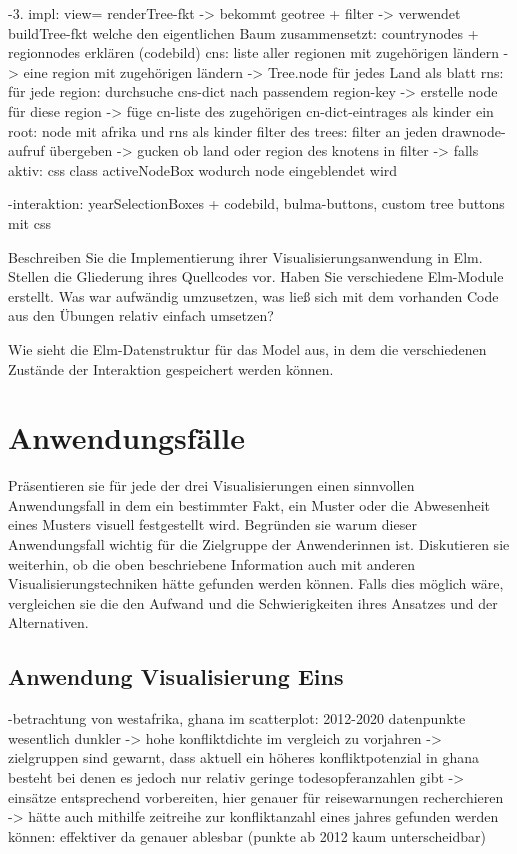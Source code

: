 \documentclass[usegeometry=true]{scrartcl}
\begin{document}
-3. impl: view= renderTree-fkt -> bekommt geotree + filter -> verwendet buildTree-fkt welche den eigentlichen Baum zusammensetzt: countrynodes + regionnodes erklären (codebild)
cns: liste aller regionen mit zugehörigen ländern -> eine region mit zugehörigen ländern -> Tree.node für jedes Land als blatt
rns: für jede region: durchsuche cns-dict nach passendem region-key -> erstelle node für diese region -> füge cn-liste des zugehörigen cn-dict-eintrages als kinder ein
root: node mit afrika und rns als kinder
filter des trees: filter an jeden drawnode-aufruf übergeben -> gucken ob land oder region des knotens in filter -> falls aktiv: css class activeNodeBox wodurch node eingeblendet wird
 
-interaktion: yearSelectionBoxes + codebild, bulma-buttons, custom tree buttons mit css


Beschreiben Sie die Implementierung ihrer Visualisierungsanwendung in Elm. Stellen die Gliederung ihres Quellcodes vor. Haben Sie verschiedene Elm-Module erstellt. Was war aufwändig umzusetzen, was ließ sich mit dem vorhanden Code aus den Übungen relativ einfach umsetzen?

Wie sieht die Elm-Datenstruktur für das Model aus, in dem die verschiedenen Zustände der Interaktion gespeichert werden können.

\section{Anwendungsfälle}
Präsentieren sie für jede der drei Visualisierungen einen sinnvollen Anwendungsfall in dem ein bestimmter Fakt, ein Muster oder die Abwesenheit eines Musters visuell festgestellt wird. Begründen sie warum dieser Anwendungsfall wichtig für die Zielgruppe der Anwenderinnen ist. Diskutieren sie weiterhin, ob die oben beschriebene Information auch mit anderen Visualisierungstechniken hätte gefunden werden können. Falls dies möglich wäre, vergleichen sie die den Aufwand und die Schwierigkeiten ihres Ansatzes und der Alternativen. 

\subsection{Anwendung Visualisierung Eins}
-betrachtung von westafrika, ghana im scatterplot: 2012-2020 datenpunkte wesentlich dunkler -> hohe konfliktdichte im vergleich zu vorjahren -> zielgruppen sind gewarnt, dass aktuell ein höheres konfliktpotenzial in ghana besteht bei denen es jedoch nur relativ geringe todesopferanzahlen gibt -> einsätze entsprechend vorbereiten, hier genauer für reisewarnungen recherchieren -> hätte auch mithilfe zeitreihe zur konfliktanzahl eines jahres gefunden werden können: effektiver da genauer ablesbar (punkte ab 2012 kaum unterscheidbar)
\end{document}
